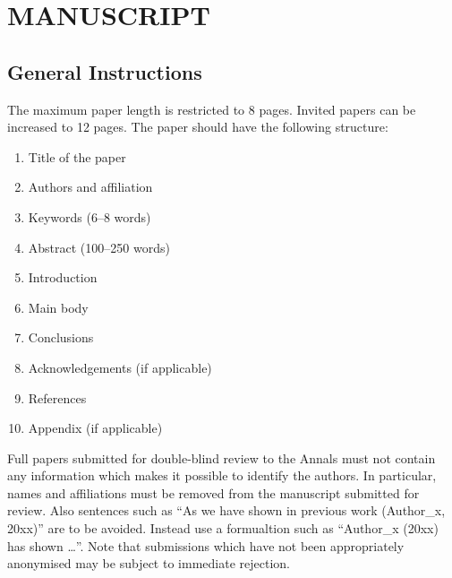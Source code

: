 \documentclass{isprs}
\begin{document}

\maketitle


\section{MANUSCRIPT}\label{MANUSCRIPT}

\sloppy

\subsection{General Instructions}\label{sec:General Instructions}

The maximum paper length is restricted to 8 pages. Invited papers can be increased to 12 pages. The paper should have the following structure: 

\begin{enumerate}
\setlength\itemsep{0em}\setlength\parskip{0em}\setlength\topsep{0em}\setlength\partopsep{0em}\setlength\parsep{0em} 
\item{Title of the paper} 
\item{Authors and affiliation}
\item{Keywords (6--8 words)}
\item{Abstract (100--250 words)}
\item{Introduction}
\item{Main body}
\item{Conclusions}
\item{Acknowledgements (if applicable)}
\item{References}
\item{Appendix (if applicable)}
\end{enumerate}

Full papers submitted for double-blind review to the Annals must not contain any information 
which makes it possible to identify the authors. In particular, names and affiliations must be 
removed from the manuscript submitted for review. Also sentences such as ``As we have shown in 
previous work (Author\_x, 20xx)'' are to be avoided. Instead use a formualtion such 
as ``Author\_x (20xx) has shown \ldots''. Note that submissions which have not been 
appropriately anonymised may be subject to immediate rejection.
\end{document}

